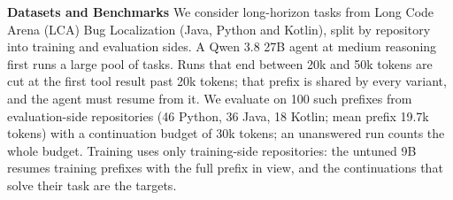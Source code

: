 %

\textbf{Datasets and Benchmarks}
We consider long-horizon tasks from Long Code Arena (LCA) Bug Localization (Java, Python and Kotlin), split by
repository into training and evaluation sides. A Qwen 3.8 27B agent at medium reasoning first runs a large pool of
tasks. Runs that end between 20k and 50k tokens are cut at the first tool result past 20k tokens; that prefix is
shared by every variant, and the agent must resume from it. We evaluate on 100 such prefixes from evaluation-side
repositories (46 Python, 36 Java, 18 Kotlin; mean prefix 19.7k tokens) with a continuation budget of 30k tokens; an
unanswered run counts the whole budget. Training uses only training-side repositories: the untuned 9B resumes
training prefixes with the full prefix in view, and the continuations that solve their task are the targets.

